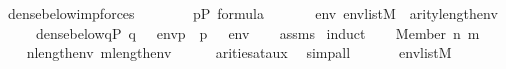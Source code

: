 \begin{isabellebody}
{\isafoldproof}%
%
\isadelimproof
\isanewline
%
\endisadelimproof
\isanewline
{}\isamarkupfalse%
\ dense{\isacharunderscore}{\kern0pt}below{\isacharunderscore}{\kern0pt}imp{\isacharunderscore}{\kern0pt}forces{\isacharcolon}{\kern0pt}\isanewline
\ \ \ \isanewline
\ \ \ \ {\isachardoublequoteopen}p{\isasymin}P{\isachardoublequoteclose}\ {\isachardoublequoteopen}{\isasymphi}{\isasymin}formula{\isachardoublequoteclose}\isanewline
\ \ \isanewline
\ \ \ \ {\isachardoublequoteopen}{\isasymAnd}env{\isachardot}{\kern0pt}\ env{\isasymin}list{\isacharparenleft}{\kern0pt}M{\isacharparenright}{\kern0pt}\ {\isasymLongrightarrow}\ arity{\isacharparenleft}{\kern0pt}{\isasymphi}{\isacharparenright}{\kern0pt}{\isasymle}length{\isacharparenleft}{\kern0pt}env{\isacharparenright}{\kern0pt}\ {\isasymLongrightarrow}\isanewline
\ \ \ \ \ dense{\isacharunderscore}{\kern0pt}below{\isacharparenleft}{\kern0pt}{\isacharbraceleft}{\kern0pt}q{\isasymin}P{\isachardot}{\kern0pt}\ {\isacharparenleft}{\kern0pt}q\ {\isasymtturnstile}\ {\isasymphi}\ env{\isacharparenright}{\kern0pt}{\isacharbraceright}{\kern0pt}{\isacharcomma}{\kern0pt}p{\isacharparenright}{\kern0pt}\ {\isasymLongrightarrow}\ {\isacharparenleft}{\kern0pt}p\ {\isasymtturnstile}\ {\isasymphi}\ env{\isacharparenright}{\kern0pt}{\isachardoublequoteclose}\isanewline
%
\isadelimproof
\ \ %
\endisadelimproof
%
\isatagproof
{}\isamarkupfalse%
\ assms{\isacharparenleft}{\kern0pt}{}{\isacharparenright}{\kern0pt}\isanewline
{}\isamarkupfalse%
\ {\isacharparenleft}{\kern0pt}induct{\isacharparenright}{\kern0pt}\isanewline
\ \ \isamarkupfalse%
\ {\isacharparenleft}{\kern0pt}Member\ n\ m{\isacharparenright}{\kern0pt}\isanewline
\ \ \isamarkupfalse%
\isanewline
\ \ \isamarkupfalse%
\ {\isachardoublequoteopen}n{\isacharless}{\kern0pt}length{\isacharparenleft}{\kern0pt}env{\isacharparenright}{\kern0pt}{\isachardoublequoteclose}\ {\isachardoublequoteopen}m{\isacharless}{\kern0pt}length{\isacharparenleft}{\kern0pt}env{\isacharparenright}{\kern0pt}{\isachardoublequoteclose}\isanewline
\ \ \ \ \isamarkupfalse%
\ arities{\isacharunderscore}{\kern0pt}at{\isacharunderscore}{\kern0pt}aux\ \isamarkupfalse%
\ simp{\isacharunderscore}{\kern0pt}all\isanewline
\ \ \isamarkupfalse%
\isanewline
\ \ \isamarkupfalse%
\ {\isachardoublequoteopen}env{\isasymin}list{\isacharparenleft}{\kern0pt}M{\isacharparenright}{\kern0pt}{\isachardoublequoteclose}\isanewline

\end{isabellebody}
